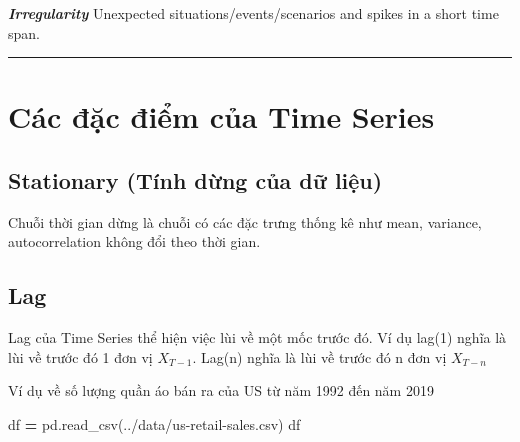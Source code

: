 \documentclass[
]{book}
\newenvironment{Shaded}{\begin{snugshade}}{\end{snugshade}}
\newcommand{\NormalTok}[1]{#1}
\newcommand{\OperatorTok}[1]{\textcolor[rgb]{0.81,0.36,0.00}{\textbf{#1}}}
\newcommand{\StringTok}[1]{\textcolor[rgb]{0.31,0.60,0.02}{#1}}
\begin{document}
\textbf{\emph{Irregularity}}
Unexpected situations/events/scenarios and spikes in a short time span.

\begin{center}\rule{0.5\linewidth}{0.5pt}\end{center}

\section{Các đặc điểm của Time Series}\label{cuxe1c-ux111ux1eb7c-ux111iux1ec3m-cux1ee7a-time-series}

\subsection{Stationary (Tính dừng của dữ liệu)}\label{stationary-tuxednh-dux1eebng-cux1ee7a-dux1eef-liux1ec7u}

Chuỗi thời gian dừng là chuỗi có các đặc trưng thống kê như mean, variance, autocorrelation không đổi theo thời gian.

\subsection{Lag}\label{lag}

Lag của Time Series thể hiện việc lùi về một mốc trước đó. Ví dụ lag(1) nghĩa là lùi về trước đó 1 đơn vị \(X_{T-1}\). Lag(n) nghĩa là lùi về trước đó n đơn vị \(X_{T-n}\)

Ví dụ về số lượng quần áo bán ra của US từ năm 1992 đến năm 2019

\begin{Shaded}
\begin{Highlighting}[]
\NormalTok{df }\OperatorTok{=}\NormalTok{ pd.read\_csv(}\StringTok{\textquotesingle{}../data/us{-}retail{-}sales.csv\textquotesingle{}}\NormalTok{)}
\NormalTok{df}
\end{Highlighting}
\end{Shaded}
\end{document}
